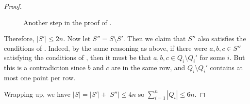 \documentclass{patmorin}
\begin{document}
\begin{proof}
   \begin{figure}
     \caption{Another step in the proof of .}
   \end{figure}

   Therefore, $|S'|\le 2n$.   Now let $S''=S\setminus S'$.  Then we
   claim that $S''$ also satisfies the conditions of .
   Indeed, by the same reasoning as above, if there were $a,b,c\in
   S''$ satisfying the conditions of , then it must
   be that $a,b,c\in Q_i\setminus Q_i'$ for some $i$.  But this is a
   contradiction since $b$ and $c$ are in the same row, and $Q_i\setminus
   Q_i'$ contains at most one point per row.

   Wrapping up, we have $|S|=|S'|+|S''| \le 4n$ so $\sum_{i=1}^n|Q_i| \le 6n$.
\end{proof}
\end{document}
